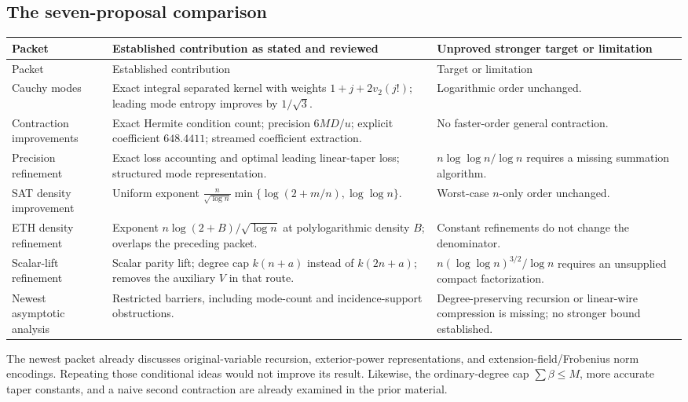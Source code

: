 \documentclass[11pt]{article}
\theoremstyle{remark}\newtheorem{remark}[theorem]{Remark}
\newcommand{\vTwo}{v_2}
\begin{document}
\subsection{The seven-proposal comparison}
\begin{longtable}{@{}p{}p{}p{}@{}}
\toprule
Packet & Established contribution as stated and reviewed & Unproved stronger target or limitation\\\midrule
\endfirsthead
\toprule Packet & Established contribution & Target or limitation\\\midrule\endhead
Cauchy modes \cite{cauchy} & Exact integral separated kernel with weights $1+j+2\vTwo(j!)$; leading mode entropy improves by $1/\sqrt3$. & Logarithmic order unchanged.\\
Contraction improvements \cite{contraction-packet} & Exact Hermite condition count; precision $6MD/u$; explicit coefficient $648.4411$; streamed coefficient extraction. & No faster-order general contraction.\\
Precision refinement \cite{precision} & Exact loss accounting and optimal leading linear-taper loss; structured mode representation. & $n\log\log n/\log n$ requires a missing summation algorithm.\\
SAT density improvement \cite{density1} & Uniform exponent $\frac n{\sqrt{\log n}}\min\{\log(2+m/n),\log\log n\}$. & Worst-case $n$-only order unchanged.\\
ETH density refinement \cite{density2} & Exponent $n\log(2+B)/\sqrt{\log n}$ at polylogarithmic density $B$; overlaps the preceding packet. & Constant refinements do not change the denominator.\\
Scalar-lift refinement \cite{scalar} & Scalar parity lift; degree cap $k(n+a)$ instead of $k(2n+a)$; removes the auxiliary $V$ in that route. & $n(\log\log n)^{3/2}/\log n$ requires an unsupplied compact factorization.\\
Newest asymptotic analysis \cite{barriers} & Restricted barriers, including mode-count and incidence-support obstructions. & Degree-preserving recursion or linear-wire compression is missing; no stronger bound established.\\
\bottomrule
\end{longtable}

The newest packet already discusses original-variable recursion, exterior-power representations, and extension-field/Frobenius norm encodings. Repeating those conditional ideas would not improve its result. Likewise, the ordinary-degree cap $\sum\beta\le M$, more accurate taper constants, and a naive second contraction are already examined in the prior material.
\end{document}
